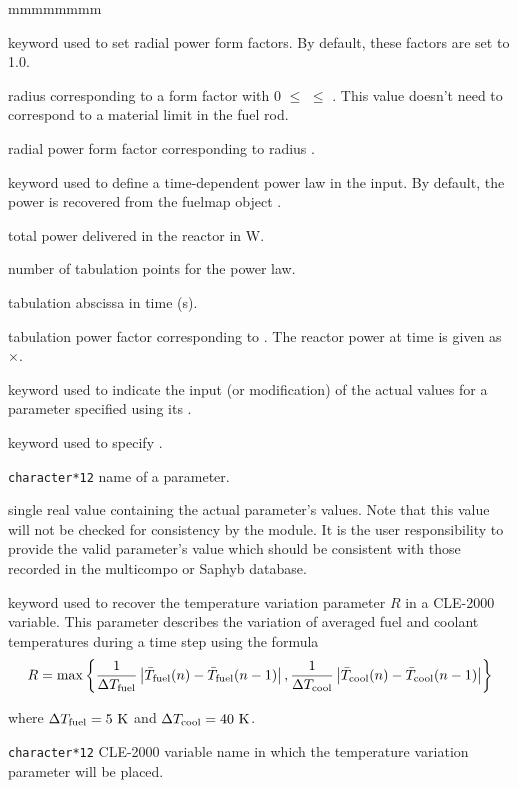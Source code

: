 \begin{ListeDeDescription}{mmmmmmmm}
\item[\moc{RAD-PROF}] keyword used to set radial power form factors. By default, these factors are set to 1.0.

\item[\dusa{rprad}] radius corresponding to a form factor with 0 $\le$  $\le$ . This value doesn't need to correspond to a
material limit in the fuel rod.

\item[\dusa{fprad}] radial power form factor corresponding to radius .

\item[\moc{POWER-LAW}] keyword used to define a time-dependent power law in the input. By default, the power is recovered from the fuelmap object .

\item[\dusa{tpow}] total power delivered in the reactor in W.

\item[\dusa{ntime}] number of tabulation points for the power law.

\item[\dusa{t(i)}] tabulation abscissa in time (s).

\item[\dusa{pow(i)}] tabulation power factor corresponding to . The reactor power at time  is given as $\times$.

\item[\moc{SET-PARAM}] keyword used to indicate the input (or modification)
of the actual values for a parameter specified using its .

\item[\moc{PNAME}] keyword used to specify .

\item[\dusa{PNAME}] \texttt{character*12} name of a parameter.

\item[\dusa{pvalue}] single real value containing the actual
parameter's values. Note that this value will not be checked for consistency
by the module. It is the user responsibility to provide the valid parameter's value
which should be consistent with those recorded in the multicompo or Saphyb database.

\item[\moc{PICK}]  keyword used to recover the temperature variation parameter $R$ in a CLE-2000 variable. This parameter describes the variation of
averaged fuel and coolant temperatures during a time step using the formula
$$ R=\max \left\{{1\over \Delta T_{\rm fuel}} \left|\bar T_{\rm fuel}(n)-\bar T_{\rm fuel}(n-1)\right|,
 {1\over \Delta T_{\rm cool}} \left|\bar T_{\rm cool}(n)-\bar T_{\rm cool}(n-1)\right| \right\}$$

\noindent where $\Delta T_{\rm fuel}=5 \ {\rm K}$ and $\Delta T_{\rm cool}=40 \ {\rm K}$.

\item[\dusa{ratio}] \texttt{character*12} CLE-2000 variable name in which the temperature variation parameter will be placed.

\end{ListeDeDescription}
\clearpage
